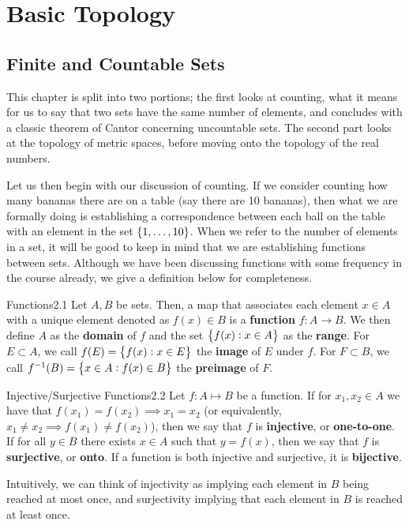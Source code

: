 \newpage
\section{Basic Topology}
\subsection{Finite and Countable Sets}
This chapter is split into two portions; the first looks at counting, what it means for us to say that two sets have the same number of elements, and concludes with a classic theorem of Cantor concerning uncountable sets. The second part looks at the topology of metric spaces, before moving onto the topology of the real numbers. 

Let us then begin with our discussion of counting. If we consider counting how many bananas there are on a table (say there are 10 bananas), then what we are formally doing is establishing a correspondence between each ball on the table with an element in the set $\set{1, \ldots, 10}$. When we refer to the number of elements in a set, it will be good to keep in mind that we are establishing functions between sets. Although we have been discussing functions with some frequency in the course already, we give a definition below for completeness. 

\begin{definition}{Functions}{2.1}
    Let $A, B$ be sets. Then, a map that associates each element $x \in A$ with a unique element denoted as $f(x) \in B$ is a \textbf{function} $f: A \rightarrow B$. We then define $A$ as the \textbf{domain} of $f$ and the set $\set{f(x): x \in A}$ as the \textbf{range}. For $E \subset A$, we call $f(E) = \set{f(x): x \in E}$ the \textbf{image} of $E$ under $f$. For $F \subset B$, we call $f^{-1}(B) = \set{x \in A: f(x) \in B}$ the \textbf{preimage} of $F$. 
\end{definition}

\begin{definition}{Injective/Surjective Functions}{2.2}
    Let $f: A \mapsto B$ be a function. If for $x_1, x_2 \in A$ we have that $f(x_1) = f(x_2) \implies x_1 = x_2$ (or equivalently, $x_1 \neq x_2 \implies f(x_1) \neq f(x_2)$), then we say that $f$ is \textbf{injective}, or \textbf{one-to-one}. If for all $y \in B$ there exists $x \in A$ such that $y = f(x)$, then we say that $f$ is \textbf{surjective}, or \textbf{onto}. If a function is both injective and surjective, it is \textbf{bijective}.
\end{definition}
\noindent Intuitively, we can think of injectivity as implying each element in $B$ being reached at most once, and surjectivity implying that each element in $B$ is reached at least once. 

